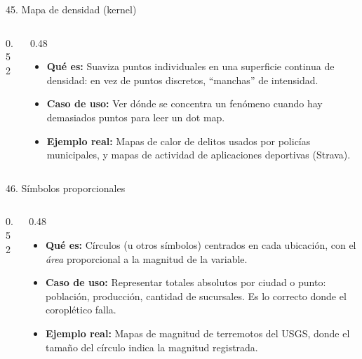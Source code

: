 \documentclass[aspectratio=169,9pt]{beamer}
\newcommand{\ficha}[3]{%
\begin{itemize}
\item \textbf{Qué es:} #1
\item \textbf{Caso de uso:} #2
\item \textbf{Ejemplo real:} #3
\end{itemize}}
\begin{document}
\begin{frame}{45. Mapa de densidad (kernel)}
\begin{columns}[T]
\begin{column}{0.52\textwidth}
\centering
{}
\end{column}
\begin{column}{0.48\textwidth}
\ficha{Suaviza puntos individuales en una superficie continua de densidad: en vez de puntos discretos, ``manchas'' de intensidad.}
{Ver dónde se concentra un fenómeno cuando hay demasiados puntos para leer un dot map.}
{Mapas de calor de delitos usados por policías municipales, y mapas de actividad de aplicaciones deportivas (Strava).}
\end{column}
\end{columns}
\end{frame}

\begin{frame}{46. Símbolos proporcionales}
\begin{columns}[T]
\begin{column}{0.52\textwidth}
\centering
{}
\end{column}
\begin{column}{0.48\textwidth}
\ficha{Círculos (u otros símbolos) centrados en cada ubicación, con el \emph{área} proporcional a la magnitud de la variable.}
{Representar totales absolutos por ciudad o punto: población, producción, cantidad de sucursales. Es lo correcto donde el coroplético falla.}
{Mapas de magnitud de terremotos del USGS, donde el tamaño del círculo indica la magnitud registrada.}
\end{column}
\end{columns}
\end{frame}
\end{document}
